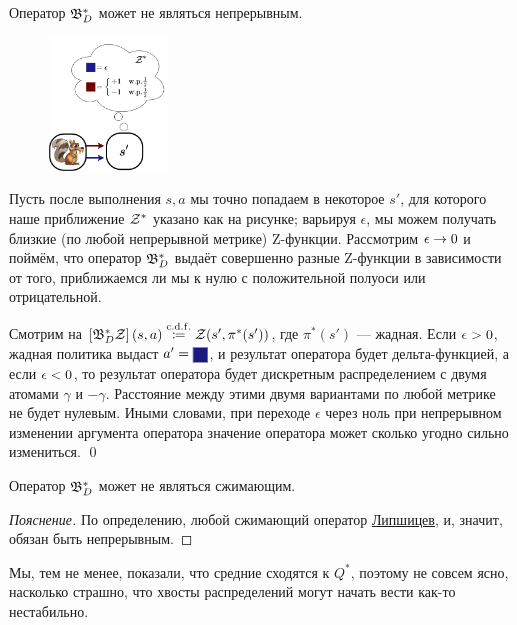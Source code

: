 \begin{theorem}
Оператор $\mathfrak{B}^*_D$ может не являться непрерывным.

\begin{figure}
\vspace{-1cm}
\centering
\includegraphics[width=0.28\textwidth]{Images/distributionalVIissue.png}
\vspace{0.2cm}
\end{figure}
\beginproof
Пусть после выполнения $s, a$ мы точно попадаем в некоторое $s'$, для которого наше приближение $\mathcal{Z}^*$ указано как на рисунке; варьируя $\epsilon$, мы можем получать близкие (по любой непрерывной метрике) Z-функции. Рассмотрим $\epsilon \HM\to 0$ и поймём, что оператор $\mathfrak{B}^*_D$ выдаёт совершенно разные Z-функции в зависимости от того, приближаемся ли мы к нулю с положительной полуоси или отрицательной.

Смотрим на $\left[ \B^*_D \Z \right](s, a) \HM\cdfcoloneqq \Z(s', \pi^*(s'))$, где $\pi^*(s')$ --- жадная. Если $\epsilon \HM> 0$, жадная политика выдаст $a' \HM= \text{\colorsquare{ChadBlue}}$, и результат оператора будет дельта-функцией, а если $\epsilon \HM< 0$, то результат оператора будет дискретным распределением с двумя атомами $\gamma$ и $-\gamma$. Расстояние между этими двумя вариантами по любой метрике не будет нулевым. Иными словами, при переходе $\epsilon$ через ноль при непрерывном изменении аргумента оператора значение оператора может сколько угодно сильно измениться. \qed
\end{theorem}

\begin{proposition}
Оператор $\mathfrak{B}^*_D$ может не являться сжимающим.
\begin{proof}[Пояснение] По определению, любой сжимающий оператор \href{https://ru.wikipedia.org/wiki/Липшицево_отображение}{Липшицев}, и, значит, обязан быть непрерывным.
\end{proof}
\end{proposition}

Мы, тем не менее, показали, что средние сходятся к $Q^*$, поэтому не совсем ясно, насколько страшно, что хвосты распределений могут начать вести как-то нестабильно.

